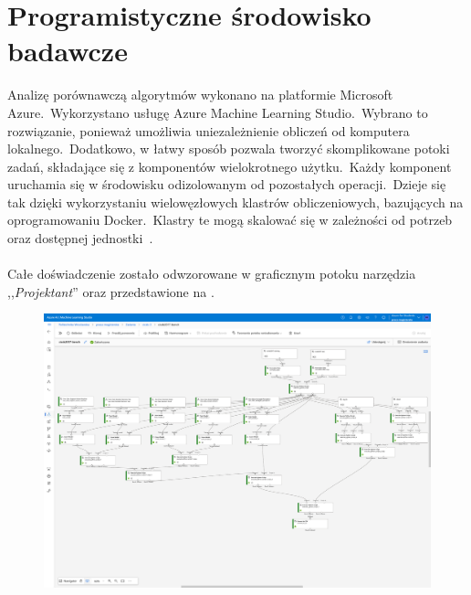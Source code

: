 \section{Programistyczne środowisko badawcze}
Analizę porównawczą algorytmów wykonano na platformie Microsoft Azure.\ Wykorzystano usługę Azure Machine Learning Studio.\ Wybrano to rozwiązanie, ponieważ umożliwia uniezależnienie obliczeń od komputera lokalnego.\ Dodatkowo, w łatwy sposób pozwala tworzyć skomplikowane potoki zadań, składające się z komponentów wielokrotnego użytku.\ Każdy komponent uruchamia się w środowisku odizolowanym od pozostałych operacji.\ Dzieje się tak dzięki wykorzystaniu wielowęzłowych klastrów obliczeniowych, bazujących na oprogramowaniu Docker.\ Klastry te mogą skalować się w zależności od potrzeb oraz dostępnej jednostki~\cite{MicrosoftLearn2023}.
\\ \\
Całe doświadczenie zostało odwzorowane w graficznym potoku narzędzia ,,\textit{Projektant}'' oraz przedstawione na .

\begin{landscape}
    \centering
    \begin{figure}[H]
        \centering
        \includegraphics[height=0.9\textwidth]{images/pipeline}
        \label{fig:pipeline}
    \end{figure}
\end{landscape}

